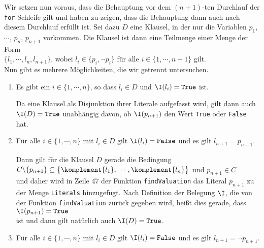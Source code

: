 \begin{enumerate}
             Wir setzen nun voraus, dass die Behauptung vor dem $(n\!+\!1)$-ten Durchlauf der
             \texttt{for}-Schleife gilt und haben zu zeigen, dass die Behauptung dann auch nach
             diesem Durchlauf erfüllt ist.  Sei dazu $D$ eine Klausel, in der nur die Variablen
             $p_1$, $\cdots$, $p_n$, $p_{n+1}$ vorkommen.  Die Klausel ist dann eine Teilmenge einer
             Menge der Form
             \\[0.2cm]
             \hspace*{1.3cm}
             $\{ l_1, \cdots, l_n, l_{n+1} \}$, \quad wobei $l_i \in \{ p_i, \neg p_i \}$ für alle
             $i \in \{1,\cdots, n+1\}$ gilt.
             \\[0.2cm]
             Nun gibt es mehrere Möglichkeiten, die wir getrennt untersuchen.
             \begin{enumerate}
             \item Es gibt ein $i \in \{1,\cdots,n\}$, so dass $l_i \in D$ und  $\I(l_i) =
               \texttt{True}$ ist.  

                   Da eine Klausel als Disjunktion ihrer Literale aufgefasst wird, gilt dann auch
                   $\I(D) = \texttt{True}$ unabhängig davon, ob $\I(p_{n+1})$ den Wert \texttt{True} oder
                   \texttt{False} hat.
             \item Für alle $i \in \{1,\cdots,n\}$ mit $l_i \in D$ gilt $\I(l_i) = \texttt{False}$ und es gilt $l_{n+1} = p_{n+1}$.
                   
                   Dann gilt für die Klausel $D$ gerade die Bedingung
                   \\[0.2cm]
                   \hspace*{1.3cm}
                   $C \backslash \{ p_{n+1} \} \subseteq \bigl\{ \komplement{l_1}, \cdots, \komplement{l_n} \bigr\}$
                   \quad und \quad $p_{n+1} \in C$
                   \\[0.2cm]
                   und daher wird in Zeile 47 der Funktion \texttt{findValuation} das Literal $p_{n+1}$ 
                   zu der Menge \texttt{Literals} hinzugefügt.  Nach Definition der Belegung $\I$, 
                   die von der Funktion \texttt{findValuation} zurück gegeben wird, heißt dies
                   gerade, dass 
                   \\[0.2cm]
                   \hspace*{1.3cm}
                   $\I(p_{n+1}) = \texttt{True}$
                   \\[0.2cm]
                   ist und dann gilt natürlich auch $\I(D) = \texttt{True}$.
             \item Für alle $i \in \{1,\cdots,n\}$ mit $l_i \in D$ gilt $\I(l_i) = \texttt{False}$ und es gilt $l_{n+1} = \neg p_{n+1}$.


\end{enumerate}
\end{enumerate}

